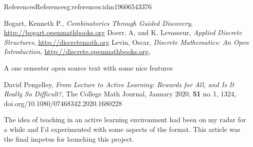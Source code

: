 \documentclass[oneside,10pt,]{book}
\newcommand{\xreffont}{\relax}
\numberwithin{equation}{section}
\begin{document}
\typeout{************************************************}
%
\begin{references-chapter-numberless}{References}{}{References}{}{}{g:references:idm19606543376}
%
\begin{referencelist}
\hypertarget{x:biblio:biblio-bogart-2017}{}Bogart, Kenneth P., \textit{Combinatorics Through Guided Discovery}, \href{http://bogart.openmathbooks.org}{http:\slash{}\slash{}bogart.openmathbooks.org}
\hypertarget{x:biblio:biblio-doerr-2019}{}Doerr, A, and K. Levasseur, \textit{Applied Discrete Structures}, \href{http://discretemath.org}{http:\slash{}\slash{}discretemath.org}
\hypertarget{x:biblio:biblio-levin-2020}{}Levin, Oscar, \textit{Discrete Mathematics: An Open Introduction}, \href{http://discrete.openmathbooks.org}{http:\slash{}\slash{}discrete.openmathbooks.org}, \par%
A one semester open source text with some nice features%

\hypertarget{x:biblio:biblio-pengelley}{}David Pengelley, \textit{From Lecture to Active Learning: Rewards for All, and Is It Really So Difficult?}, The College Math Journal, January 2020, \textbf{51} no.\@\,1, 13\textendash{}24, doi.org\slash{}10.1080\slash{}07468342.2020.1680228\par%
The idea of teaching in an active learning environment had been on my radar for a while and I'd experimented with some aspects of the format. This article was the final impetus for launching this project.%

\end{referencelist}
\end{references-chapter-numberless}
%
{\xreffont\printindex}
%
\end{document}
